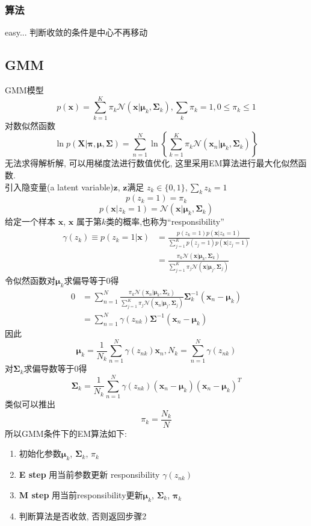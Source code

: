 \documentclass[12pt,letterpaper]{article}
\begin{document}
\subsubsection{算法}
easy... 判断收敛的条件是中心不再移动
	
\subsection{GMM}
GMM模型
\[
	p(\bm{x}) = \sum_{k=1}^{K} \pi_k \mathcal{N}(\bm{x}| \bm{\mu}_k, \bm{\Sigma}_k), \sum_{k} \pi_k = 1, 0 \leq \pi_k \leq 1
\] 	
对数似然函数
\begin{equation}
	\label{form1} 
	\ln p(\bm{X}|\bm{\pi}, \bm{\mu}, \bm{\Sigma}) = \sum_{n=1}^{N} \ln 
	\left\{
		\sum_{k=1}^{K} \pi_k \mathcal{N}(\bm{x}_n| \bm{\mu}_k,\bm{\Sigma}_k)	
	\right\}
\end{equation}
无法求得解析解, 可以用梯度法进行数值优化, 这里采用EM算法进行最大化似然函数. \\
引入隐变量(a latent variable)$\bm{z}$,  $\bm{z}$满足 $z_k \in \{0,1\}, \sum_{k} z_k = 1$ 
\[
	p(z_k = 1) = \pi_k
\]
\[
	p(\bm{x}|z_k = 1) = \mathcal{N}(\bm{x}|\bm{\mu}_k, \bm{\Sigma}_k)
\]
给定一个样本 $\bm{x}$, $\bm{x}$ 属于第$k$类的概率,也称为``responsibility''
\[
	\begin{split} 
	\mathcal{\gamma}(z_k) \equiv p(z_k = 1|\bm{x}) &= \frac{ p(z_k=1) p(\bm{x}|z_k=1)}{\sum_{j=1}^{K}p(z_j=1)p(\bm{x}|z_j = 1)	}  \\
	&= \frac{\pi_k  \mathcal{N}(\bm{x}|\bm{\mu}_k, \bm{\Sigma}_k)}{\sum_{j=1}^{K}\pi_j \mathcal{N}(\bm{x}|\bm{\mu}_j, \bm{\Sigma}_j)	}
	\end{split} 
\]
令似然函数对$\bm{\mu}_k$求偏导等于0得
\[
	\begin{split} 
	0 &= \sum_{n=1}^{N} \frac{\pi_k \mathcal{N}(\bm{x}_n|\bm{\mu}_k, \bm{\Sigma}_k)}{\sum_{j=1}^{K} \pi_j \mathcal{N}(\bm{x}_n|\bm{\mu}_j, \bm{\Sigma}_j)} \bm{\Sigma}_k^{-1}(\bm{x}_n - \bm{\mu}_k) \\
	&= \sum_{n=1}^{N} \mathcal{\gamma}(z_{nk}) \bm{\Sigma}^{-1}(\bm{x}_n - \bm{\mu}_k)	
	\end{split} 
\]
因此
\[
	\bm{\mu}_k = \frac{1}{N_k} \sum_{n=1}^{N} \mathcal{\gamma}(z_{nk})\bm{x}_n, 
	N_k = \sum_{n=1}^{N} \mathcal{\gamma}(z_{nk}) 
\]
对$\bm{\Sigma}_k$求偏导数等于0得
\[
	\bm{\Sigma}_k = \frac{1}{N_k} \sum_{n=1}^{N} \mathcal{\gamma}(z_{nk}) (\bm{x}_n - \bm{\mu}_k)
	(\bm{x}_n - \bm{\mu}_k)^T
\]	
类似可以推出
\[
	\pi_k = \frac{N_k}{N}
\]
所以GMM条件下的EM算法如下:
\begin{enumerate}
	\item 初始化参数$\bm{\mu}_k$, $\bm{\Sigma}_k$, $\pi_k$
	\item \textbf{E step} 用当前参数更新 responsibility $\mathcal{\gamma}(z_{nk})$
	\item \textbf{M step} 用当前responsibility更新$\bm{\mu}_k$, $\bm{\Sigma}_k$, $\bm{\pi}_k$
	\item 判断算法是否收敛, 否则返回步骤2
\end{enumerate}
	
	
	
	
	
	
	
	
\end{document}
